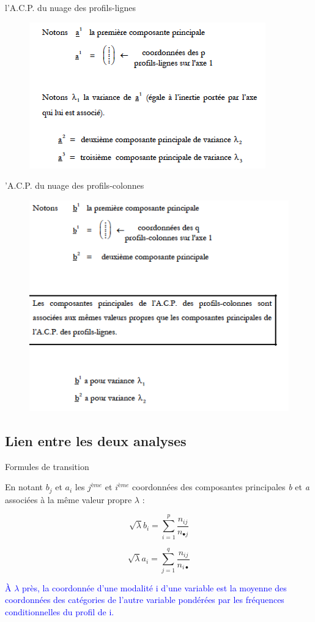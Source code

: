 \documentclass[12pt]{beamer}
\begin{document}
\begin{frame}{l’A.C.P. du nuage des profils-lignes }
\begin{figure}
\includegraphics[scale=0.8]{exemple12.png}  
\end{figure}
\end{frame}
\begin{frame}{’A.C.P. du nuage des profils-colonnes}
\begin{figure}
\includegraphics[scale=0.6]{exemple13.png}  
\end{figure}
\end{frame}
\subsection{Lien entre les deux analyses }

\begin{frame}{Formules de transition}

En notant $b_j$ et $a_i$ les $j^{ème}$ et $i^{ème}$ coordonnées des composantes principales \textit{b} et \textit{a} associées à la même valeur propre $\lambda$ : 

$$ \sqrt{\lambda}b_i=\sum_{i=1}^p\frac{n_{ij}}{n_{\bullet j}}  $$

$$ \sqrt{\lambda}a_i=\sum_{j=1}^q\frac{n_{ij}}{n_{i \bullet }}  $$


\textcolor{blue}{À $\lambda$ près, la coordonnée d’une modalité i d’une variable est la moyenne des coordonnées des catégories de l’autre variable pondérées par les fréquences conditionnelles du profil de i.}
\end{frame}
\end{document}
